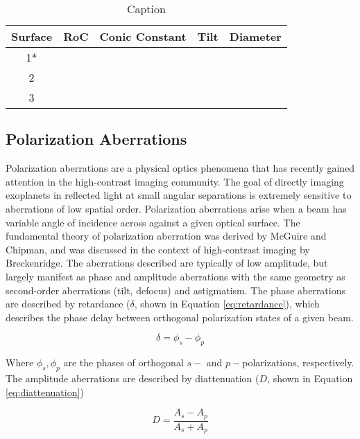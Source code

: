 \begin{table}[H]
    \centering
    \begin{tabular}{c c c c c}
    \hline
        Surface & RoC & Conic Constant & Tilt & Diameter  \\
    \hline
        1* & & & & \\
        2 & & & & \\
        3 & & & & \\
    \hline
    \hline
    \end{tabular}
    \caption{Caption}
    \label{tab:space_prescription}
\end{table}

\subsection{Polarization Aberrations}
Polarization aberrations are a physical optics phenomena that has recently gained attention in the high-contrast imaging community. The goal of directly imaging exoplanets in reflected light at small angular separations is extremely sensitive to aberrations of low spatial order. Polarization aberrations arise when a beam has variable angle of incidence across against a given optical surface. The fundamental theory of polarization aberration was derived by McGuire and Chipman\cite{mcguire_rotationally_symmetric,mcguire_nonrotsymm}, and was discussed in the context of high-contrast imaging by Breckenridge\cite{breckenridge_the_psf}. The aberrations described are typically of low amplitude, but largely manifest as phase and amplitude aberrations with the same geometry as second-order aberrations (tilt, defocus) and astigmatism. The phase aberrations are described by retardance ($\delta$, shown in Equation \ref{eq:retardance}), which describes the phase delay between orthogonal polarization states of a given beam.

\begin{equation}
	\delta = \phi_{s} - \phi_{p}
	\label{eq:retardance}
\end{equation}

Where $\phi_{s},\phi_{p}$ are the phases of orthogonal $s-$ and $p-$polarizations, respectively. The amplitude aberrations are described by diattenuation ($D$, shown in Equation \ref{eq:diattenuation})

\begin{equation}
	D = \frac{A_{s} - A_{p}}{A_{s} + A_{p}}	
	\label{eq:diattenuation}
\end{equation}

